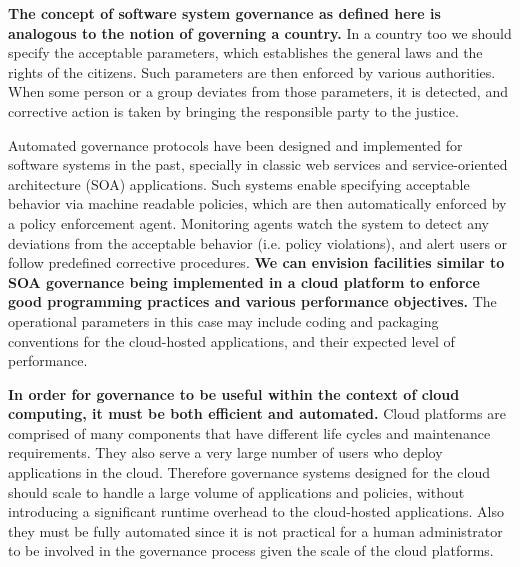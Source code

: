 \textbf{The concept of software system governance as defined here is analogous to the
notion of governing a country.} In a country too we should specify the acceptable
parameters, which establishes the general laws and the rights of the citizens. Such 
parameters are then
enforced by various authorities. When some person or a group deviates from those parameters,
it is detected, and corrective action is taken by bringing the responsible party to the justice.

Automated governance protocols have been designed and implemented for software systems in
the past, specially in classic web services and service-oriented architecture (SOA) applications. 
Such systems enable specifying
acceptable behavior via machine readable policies, which are then automatically enforced by
a policy enforcement agent. Monitoring agents watch the system to detect any deviations from
the acceptable behavior (i.e. policy violations), and alert users or follow predefined corrective
procedures. \textbf{We can envision facilities similar to SOA governance being implemented in a cloud platform to 
enforce good programming practices and various performance objectives.} The operational
parameters in this case may include coding and packaging conventions for the cloud-hosted
applications, and their expected level of performance.

\textbf{In order for governance to be
useful within the context of cloud computing, it must be both efficient and automated.}
Cloud platforms are comprised of many components that have different life cycles
and maintenance requirements. 
They also serve a very large number of users who deploy applications in
the cloud. Therefore governance systems designed for the cloud should scale to handle a 
large volume of applications and policies,
without introducing a significant runtime overhead to the cloud-hosted applications.
Also they must be fully automated since it is not practical for a human administrator to be
involved in the governance process given the scale of the cloud platforms.

